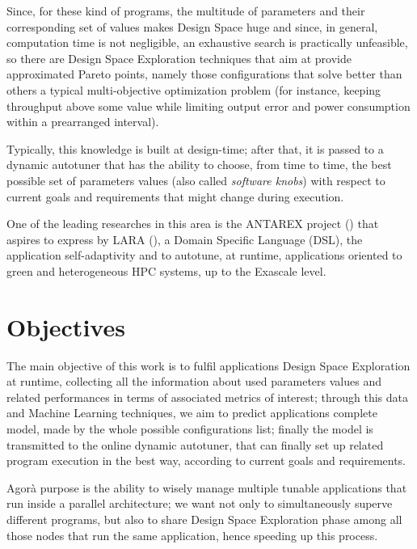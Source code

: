 Since, for these kind of programs, the multitude of parameters and their corresponding set of values makes Design Space huge and since, in general, computation time is not negligible, an exhaustive search is practically unfeasible, so there are Design Space Exploration techniques that aim at provide approximated Pareto points, namely those configurations that solve better than others a typical multi-objective optimization problem (for instance, keeping throughput above some value while limiting output error and power consumption within a prearranged interval).

Typically, this knowledge is built at design-time; after that, it is passed to a dynamic autotuner that has the ability to choose, from time to time, the best possible set of parameters values (also called \textit{software knobs}) with respect to current goals and requirements that might change during execution.

One of the leading researches in this area is the ANTAREX project (\cite{silvano2016antarex}) that aspires to express by LARA (\cite{cardoso2012lara, cardoso2014performance}), a Domain Specific Language (DSL), the application self-adaptivity and to autotune, at runtime, applications oriented to green and heterogeneous HPC systems, up to the Exascale level.





\section{Objectives}

The main objective of this work is to fulfil applications Design Space Exploration at runtime, collecting all the information about used parameters values and related performances in terms of associated metrics of interest; through this data and Machine Learning techniques, we aim to predict applications complete model, made by the whole possible configurations list; finally the model is transmitted to the online dynamic autotuner, that can finally set up related program execution in the best way, according to current goals and requirements.

Agorà purpose is the ability to wisely manage multiple tunable applications that run inside a parallel architecture; we want not only to simultaneously superve different programs, but also to share Design Space Exploration phase among all those nodes that run the same application, hence speeding up this process.

